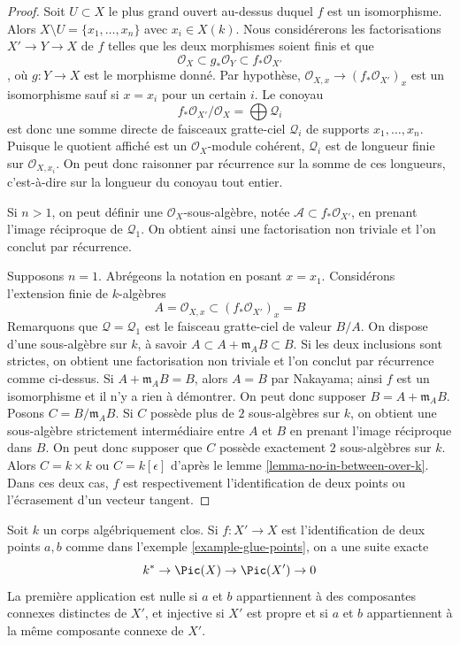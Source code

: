 \begin{proof}
Soit $U \subset X$ le plus grand ouvert au-dessus duquel $f$ est un isomorphisme. Alors $X \setminus U = \{x_1, \ldots, x_n\}$ avec $x_i \in X(k)$. Nous considérerons les factorisations $X' \to Y \to X$ de $f$ telles que les deux morphismes soient finis et que $$
\mathcal{O}_X \subset g_*\mathcal{O}_Y \subset f_*\mathcal{O}_{X'}
$$, où $g : Y \to X$ est le morphisme donné. Par hypothèse, $\mathcal{O}_{X, x} \to (f_*\mathcal{O}_{X'})_x$ est un isomorphisme sauf si $x = x_i$ pour un certain $i$. Le conoyau $$
f_*\mathcal{O}_{X'}/\mathcal{O}_X = \bigoplus \mathcal{Q}_i
$$ est donc une somme directe de faisceaux gratte-ciel $\mathcal{Q}_i$ de supports $x_1, \ldots, x_n$. Puisque le quotient affiché est un $\mathcal{O}_X$-module cohérent, $\mathcal{Q}_i$ est de longueur finie sur $\mathcal{O}_{X, x_i}$. On peut donc raisonner par récurrence sur la somme de ces longueurs, c'est-à-dire sur la longueur du conoyau tout entier.

\medskip\noindent
Si $n > 1$, on peut définir une $\mathcal{O}_X$-sous-algèbre, notée $\mathcal{A} \subset f_*\mathcal{O}_{X'}$, en prenant l'image réciproque de $\mathcal{Q}_1$. On obtient ainsi une factorisation non triviale et l'on conclut par récurrence.

\medskip\noindent
Supposons $n = 1$. Abrégeons la notation en posant $x = x_1$. Considérons l'extension finie de $k$-algèbres $$
A = \mathcal{O}_{X, x} \subset (f_*\mathcal{O}_{X'})_x = B
$$ Remarquons que $\mathcal{Q} = \mathcal{Q}_1$ est le faisceau gratte-ciel de valeur $B/A$. On dispose d'une sous-algèbre sur $k$, à savoir $A \subset A + \mathfrak m_A B \subset B$. Si les deux inclusions sont strictes, on obtient une factorisation non triviale et l'on conclut par récurrence comme ci-dessus. Si $A + \mathfrak m_A B = B$, alors $A = B$ par Nakayama; ainsi $f$ est un isomorphisme et il n'y a rien à démontrer. On peut donc supposer $B = A + \mathfrak m_A B$. Posons $C = B/\mathfrak m_A B$. Si $C$ possède plus de $2$ sous-algèbres sur $k$, on obtient une sous-algèbre strictement intermédiaire entre $A$ et $B$ en prenant l'image réciproque dans $B$. On peut donc supposer que $C$ possède exactement $2$ sous-algèbres sur $k$. Alors $C = k \times k$ ou $C = k[\epsilon]$ d'après le lemme \ref{lemma-no-in-between-over-k}. Dans ces deux cas, $f$ est respectivement l'identification de deux points ou l'écrasement d'un vecteur tangent.
\end{proof}

\begin{lemma}
\label{lemma-glue-points}
Soit $k$ un corps algébriquement clos. Si $f : X' \to X$ est l'identification de deux points $a, b$ comme dans l'exemple \ref{example-glue-points}, on a une suite exacte $$
k^* \to \Pic(X) \to \Pic(X') \to 0
$$ La première application est nulle si $a$ et $b$ appartiennent à des composantes connexes distinctes de $X'$, et injective si $X'$ est propre et si $a$ et $b$ appartiennent à la même composante connexe de $X'$.
\end{lemma}

